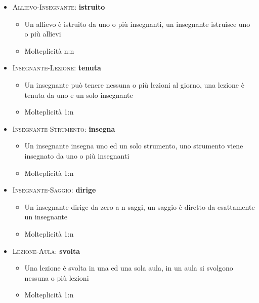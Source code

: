 \documentclass{article}
\begin{document}
\smallskip

\begin{itemize}
\item \textsc {Allievo-Insegnante}: \textbf{istruito}
	\begin{itemize}
	\item Un allievo è istruito da uno o più insegnanti, un insegnante istruisce uno o più allievi
	\item Molteplicità n:n
	\end{itemize}
\end{itemize}

\smallskip

\newpage
\begin{itemize}
\item \textsc {Insegnante-Lezione}: \textbf{tenuta}
	\begin{itemize}
	\item Un insegnante può tenere nessuna o più lezioni al giorno, una lezione è tenuta da uno e un solo insegnante
	\item Molteplicità 1:n
	\end{itemize}
\end{itemize}

\smallskip

\begin{itemize}
\item \textsc {Insegnante-Strumento}: \textbf{insegna}
	\begin{itemize}
	\item Un insegnante insegna uno ed un solo strumento, uno strumento viene insegnato da uno o più insegnanti
	\item Molteplicità 1:n
	\end{itemize}
\end{itemize}

\smallskip

\begin{itemize}
\item \textsc{Insegnante-Saggio}: \textbf{dirige}
	\begin{itemize}
	\item Un insegnante dirige da zero a n saggi, un saggio è diretto da esattamente un insegnante
	\item Molteplicità 1:n
	\end{itemize}
\end{itemize}

\begin{itemize}
\item \textsc {Lezione-Aula}: \textbf{svolta}
	\begin{itemize}
	\item Una lezione è svolta in una ed una sola aula, in un aula si svolgono nessuna o più lezioni
	\item Molteplicità 1:n
	\end{itemize}
\end{itemize}
\end{document}
